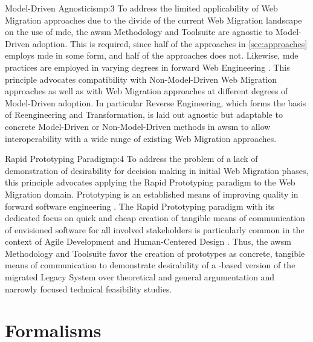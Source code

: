 \begin{thesisprinciple}{Model-Driven Agnosticism}{p:3}
To address the limited applicability of \gls{Web Migration} approaches due to the divide of the current \gls{Web Migration} landscape on the use of \gls{mde}, the \gls{awsm} Methodology and Toolsuite are agnostic to Model-Driven adoption.
This is required, since half of the approaches in \cref{sec:approaches}  employs \gls{mde} in some form, and half of the approaches does not.
Likewise, \gls{mde} practices are employed in varying degrees in forward \gls{Web Engineering} \autocite{Moreno2008MDWE}.
This principle advocates compatibility with Non-Model-Driven \gls{Web Migration} approaches as well as with \gls{Web Migration} approaches at different degrees of Model-Driven adoption.
In particular \gls{Reverse Engineering}, which forms the basis of \gls{Reengineering} and \gls{Transformation}, is laid out agnostic but adaptable to concrete Model-Driven or Non-Model-Driven methods in \gls{awsm} to allow interoperability with a wide range of existing \gls{Web Migration} approaches.
\end{thesisprinciple}

\vspace{-10pt}
\begin{thesisprinciple}{Rapid Prototyping Paradigm}{p:4}
To address the problem of a lack of demonstration of desirability for decision making in initial \gls{Web Migration} phases, this principle advocates applying the \gls{Rapid Prototyping} paradigm to the \gls{Web Migration} domain.
\gls{Prototyping} is an established means of improving quality in forward software engineering \autocite{Wallmueller2001SoftwareQuality}.
The \gls{Rapid Prototyping} paradigm \autocite{Gordon1995RapidPrototyping} with its dedicated focus on quick and cheap creation of tangible means of communication of envisioned software for all involved stakeholders \autocite{Alavi1984} is particularly common in the context of Agile Development \autocite{Abrahamsson2002Agile} and Human-Centered Design \autocite{HCD2015}.
Thus, the \gls{awsm} Methodology and Toolsuite favor the creation of prototypes as concrete, tangible means of communication to demonstrate desirability of a -based version of the migrated \gls{Legacy System} over theoretical and general argumentation and narrowly focused technical feasibility studies.
\end{thesisprinciple}

\vspace{-15pt}
\hypertarget{sec:formalisms}{%
\section{Formalisms}\label{sec:formalisms}}
\vspace{10pt}

